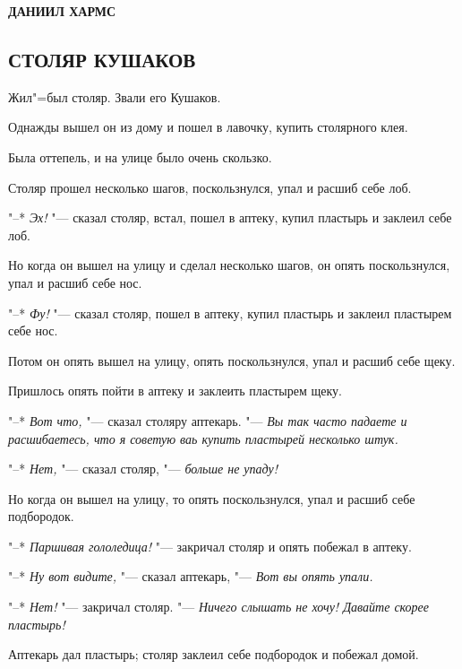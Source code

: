 \documentclass{article}
\begin{document}
\begin{center}
\Huge \bf{ДАНИИЛ ХАРМС}
\end{center}

\vspace{1cm}
\begin{center}
\section*{СТОЛЯР КУШАКОВ}
\end{center}
    
Жил"=был столяр. Звали его  Кушаков.

    Однажды  вышел  он из дому и пошел в лавочку, 
    купить столярного клея.

    Была  оттепель,  и  на  улице было очень
скользко.

Столяр прошел несколько шагов, поскользнулся, 
упал и расшиб себе лоб.

    "--* \textit{Эх!} "--- сказал  столяр,  встал,  пошел в
аптеку, купил пластырь и заклеил себе лоб.

    Но когда он вышел на улицу и сделал  несколько шагов,  
    он опять поскользнулся, упал
и расшиб себе нос.

"--* \textit{Фу!}  "--- сказал столяр, пошел в  аптеку,
купил пластырь и заклеил пластырем себе нос.

    Потом он опять  вышел  на  улицу,  опять
поскользнулся, упал и расшиб себе щеку.

    Пришлось опять пойти в аптеку и заклеить
пластырем щеку.

"--* \textit{Вот что,} "---  сказал столяру аптекарь. "---
\textit{Вы так часто  падаете и расшибаетесь,  что я
советую ваь купить пластырей несколько штук.}

"--* \textit{Нет,} "--- сказал столяр, "--- \textit{больше 
не упаду!}

    Но когда он вышел на улицу, то опять поскользнулся, упал и расшиб себе подбородок.

"--* \textit{Паршивая гололедица!}  "---  
закричал столяр и опять побежал в аптеку.

"--* \textit{Ну вот видите,}  "---  сказал аптекарь,  "---
\textit{Вот вы опять упали.}

"--* \textit{Нет!} "--- закричал столяр. "---  
\textit{Ничего
     слышать не хочу! Давайте скорее пластырь!}

    Аптекарь  дал пластырь;  столяр  заклеил
себе подбородок и побежал домой.
\end{document}
